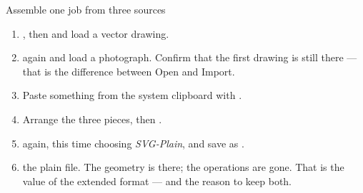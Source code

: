 \begin{tryit}{Assemble one job from three sources}
\begin{enumerate}[label=\arabic*.,leftmargin=1.4em]
  \item {}, then  and load a vector drawing.
  \item {} again and load a photograph. Confirm that the
        first drawing is still there --- that is the difference between Open and
        Import.
  \item Paste something from the system clipboard with .
  \item Arrange the three pieces, then  .
  \item {} again, this time choosing \emph{SVG-Plain}, and save
        as .
  \item {} the plain file. The geometry is there; the
        operations are gone. That is the value of the extended format --- and the
        reason to keep both.
\end{enumerate}
\end{tryit}
